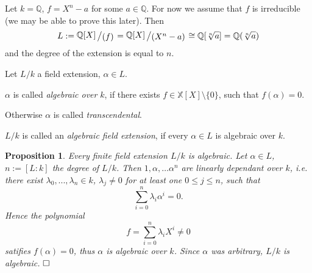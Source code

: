 \documentclass[11pt]{book}
\newtheorem{proposition}[theorem]{Proposition}
\theoremstyle{nonumberbreak}
\newenvironment{defin}[1][]{\ifthenelse{\equal{#1}{}}{\definition}{\definition[#1]}\rm}{\enddefinition}
\newenvironment{pr}[1][]{\ifthenelse{\equal{#1}{}}{\proof}{\proof[#1]}\rm}{\endproof}
\newenvironment{ex}[1][]{\ifthenelse{\equal{#1}{}}{\example}{\example[#1]}\rm}{\endexample}
\newcommand{\slant}[2]{{\raisebox{.1em}{$#1$}\left/\raisebox{-.1em}{$#2$}\right.}}
\begin{document}
\begin{spacing}{1.3}
\begin{ex}   %
Let $k=\mathbb{Q}$, $f=X^n-a$ for some $a \in \mathbb{Q}$. For now we assume that $f$ is irreducible (we may be able to prove this later). Then
$$L:=\slant{\mathbb{Q}[X]}{( f )}=\slant{\mathbb{Q}[X]}{( X^n-a)} \cong \mathbb{Q}[\sqrt[n]{a}]=\mathbb{Q}(\sqrt[n]{a})$$
and the degree of the extension is equal to $n$.
\end{ex}

\begin{defin} %
Let $L/k$ a field extension, $\alpha \in L$.
\begin{compactenum}
\item $\alpha$ is called \textit{algebraic over} $k$, if there exists $f \in \mathbb{X}[X] \setminus \{0\}$, such that $f(\alpha)=0$.
\item Otherwise $\alpha$ is called \textit{transcendental}.
\item $L/k$ is called an \textit{algebraic field extension}, if every $\alpha \in L$ is algebraic over $k$.
\end{compactenum}
\end{defin}

\begin{proposition} %
Every finite field extension $L/k$ is algebraic.
\begin{pr}
Let $\alpha \in L$, $n:=[L:k]$ the degree of $L/k$. Then $1,\alpha, \dots \alpha^{n}$ are linearly dependant over $k$, i.e. there exist $\lambda_0,...,\lambda_n \in k$, $\lambda_j \neq 0$ for at least one $0 \leqslant j \leqslant n$, such that $$\sum_{i=0}^{n} \lambda_i \alpha^{i}=0.$$
Hence the polynomial $$f=\sum_{i=0}^n \lambda_i X^{i} \neq 0$$ satifies $f(\alpha)=0$, thus $\alpha$ is algebraic over $k$. Since $\alpha$ was arbitrary, $L/k$ is algebraic. $\hfill \Box$
\end{pr}
\end{proposition}


\end{spacing}
\end{document}
